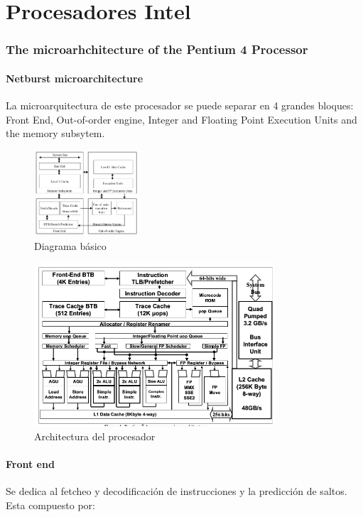 \part{Procesadores Intel}
\section{The microarhchitecture of the Pentium 4 Processor}

\subsection{Netburst microarchitecture}
La microarquitectura de este procesador se puede separar en 4 grandes bloques: Front End, Out-of-order engine, Integer and Floating Point Execution Units and the memory subsytem.

\begin{figure}[ht]
	\centering
	\includegraphics[width=0.35\textwidth]{imagenes/p4-block-architecture}
	\caption{Diagrama básico}
	\label{fig:p4DiagramaBasico}
\end{figure}
\begin{figure}[ht]
	\centering
	\includegraphics[width=0.8\textwidth]{imagenes/p4-architecture}
	\caption{Architectura del procesador}
	\label{fig:p4DiagramaCompleto}
\end{figure}

\subsection{Front end}
Se dedica al fetcheo y decodificación de instrucciones y la predicción de saltos. Esta compuesto por:
